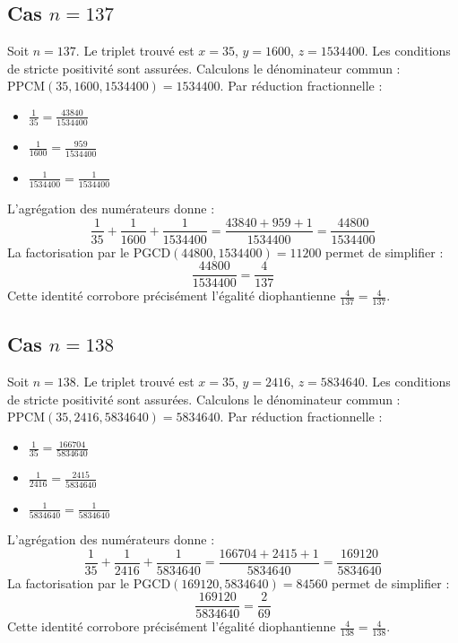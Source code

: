\documentclass[11pt,a4paper]{article}
\begin{document}
\subsection{Cas $n = 137$}
Soit $n = 137$. Le triplet trouvé est $x = 35$, $y = 1600$, $z = 1534400$.
Les conditions de stricte positivité sont assurées.
Calculons le dénominateur commun : $\text{PPCM}(35, 1600, 1534400) = 1534400$.
Par réduction fractionnelle :
\begin{itemize}
    \item $\frac{1}{35} = \frac{43840}{1534400}$
    \item $\frac{1}{1600} = \frac{959}{1534400}$
    \item $\frac{1}{1534400} = \frac{1}{1534400}$
\end{itemize}
L'agrégation des numérateurs donne :
$$ \frac{1}{35} + \frac{1}{1600} + \frac{1}{1534400} = \frac{43840 + 959 + 1}{1534400} = \frac{44800}{1534400} $$
La factorisation par le $\text{PGCD}(44800, 1534400) = 11200$ permet de simplifier :
$$ \frac{44800}{1534400} = \frac{4}{137} $$
Cette identité corrobore précisément l'égalité diophantienne $\frac{4}{137} = \frac{4}{137}$.

\subsection{Cas $n = 138$}
Soit $n = 138$. Le triplet trouvé est $x = 35$, $y = 2416$, $z = 5834640$.
Les conditions de stricte positivité sont assurées.
Calculons le dénominateur commun : $\text{PPCM}(35, 2416, 5834640) = 5834640$.
Par réduction fractionnelle :
\begin{itemize}
    \item $\frac{1}{35} = \frac{166704}{5834640}$
    \item $\frac{1}{2416} = \frac{2415}{5834640}$
    \item $\frac{1}{5834640} = \frac{1}{5834640}$
\end{itemize}
L'agrégation des numérateurs donne :
$$ \frac{1}{35} + \frac{1}{2416} + \frac{1}{5834640} = \frac{166704 + 2415 + 1}{5834640} = \frac{169120}{5834640} $$
La factorisation par le $\text{PGCD}(169120, 5834640) = 84560$ permet de simplifier :
$$ \frac{169120}{5834640} = \frac{2}{69} $$
Cette identité corrobore précisément l'égalité diophantienne $\frac{4}{138} = \frac{4}{138}$.
\end{document}
